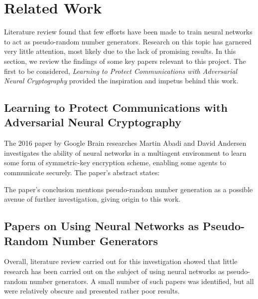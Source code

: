 \documentclass[12pt, titlepage]{report}
\theoremstyle{definition}
\begin{document}
\section{Related Work}\label{section:related_work}
Literature review found that few efforts have been made to train neural networks to act as pseudo-random number generators. Research on this topic has garnered very little attention, most likely due to the lack of promising results. In this section, we review the findings of some key papers relevant to this project. The first to be considered, \textit{Learning to Protect Communications with Adversarial Neural Cryptography} provided the inspiration and impetus behind this work.



\subsection{Learning to Protect Communications with Adversarial Neural Cryptography}
The 2016 paper by Google Brain researches Martin Abadi and David Andersen investigates the ability of neural networks in a multiagent environment to learn some form of symmetric-key encryption scheme, enabling some agents to communicate securely. The paper's abstract states:

 \cite{abadi2016learning}

The paper's conclusion mentions pseudo-random number generation as a possible avenue of further investigation, giving origin to this work. 



\subsection{Papers on Using Neural Networks as Pseudo-Random Number Generators}
Overall, literature review carried out for this investigation showed that little research has been carried out on the subject of using neural networks as pseudo-random number generators. A small number of such papers was identified, but all were relatively obscure and presented rather poor results.
\end{document}
